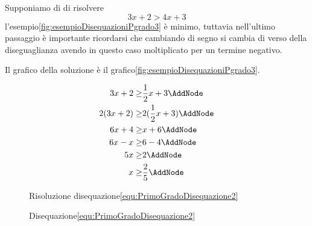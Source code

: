 Supponiamo di di risolvere 
\begin{equation}
3x+2>4x+3\label{equ:PrimoGradoDisequazione3}
\end{equation}
 l'esempio\nobs\vref{fig:esempioDisequazioniPgrado3} è minimo, tuttavia nell'ultimo passaggio è importante ricordarsi che cambiando di segno si cambia di verso della diseguaglianza  avendo in questo caso moltiplicato per un termine negativo.

Il grafico della soluzione è il grafico\nobs\vref{fig:esempioDisequazioniPgrado3}.  
\begin{figure}
\begin{NodesList}
\centering
\begin{align*}
	3x+2\geq&\dfrac{1}{2}x+3\AddNode\\
	2(3x+2)\geq&2(\dfrac{1}{2}x+3)\AddNode\\ %
	6x+4\geq&x+6\AddNode\\
	6x-x\geq&6-4\AddNode\\
	5x\geq&2\AddNode\\
	x\geq&\dfrac{2}{5}\AddNode
\end{align*}
%
%
%
%
\end{NodesList}
			\captionsetup{format=esempio,list=no}
		\caption{Risoluzione disequazione\nobs\vref{equ:PrimoGradoDisequazione2}}
\label{fig:esempioDisequazioniPgrado2}
\end{figure}
\begin{figure}
	\centering
	\captionsetup{format=grafico,list=no}
	\caption{Disequazione\nobs\vref{equ:PrimoGradoDisequazione2}}
	\label{fig:esempioDisequazioniPgradografico2}
\end{figure}
